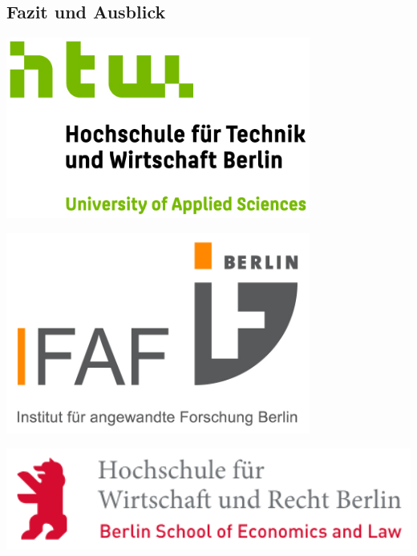 \documentclass[a0,portrait]{a0poster}
\begin{document}
\begin{multicols}{2}
\section*{Fazit und Ausblick}



\nocite{*} %

\end{multicols}

\vspace{3cm}

\begin{minipage}[b]{0.33\linewidth}
\includegraphics[width=10cm,left]{htw_logo.jpg}
\end{minipage}
\begin{minipage}[b]{0.34\linewidth}
\includegraphics[width=10cm,center]{ifaf_logo.jpg}
\end{minipage}
\begin{minipage}[b]{0.33\linewidth}
\includegraphics[width=15cm,right]{hwr_logo.png}
\end{minipage}
\end{document}
